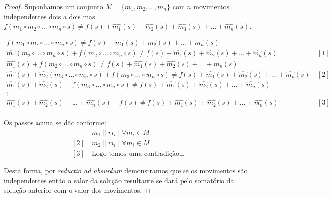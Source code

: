 \begin{proof}\label{proof:independenciaMovimentos}
Suponhamos um conjunto $M = \{ m_1, m_2, \dots, m_n \}$ com $n$ movimentos independentes dois a dois mas $f(m_1 \circ m_2 \circ \dots \circ m_n \circ s) \neq f(s) + \widehat{m_1}(s) + \widehat{m_2}(s)+ \widehat{m_3}(s) + \dots + \widehat{m_n}(s)$.

\begin{align*}
    f(m_1 \circ m_2 \circ \dots \circ m_n \circ s) \neq f(s) + \widehat{m_1}(s) + \widehat{m_2}(s) + \dots + \widehat{m_n}(s) & \\
    \widehat{m_1}(m_2 \circ \dots \circ m_n \circ s) + f(m_2 \circ \dots \circ m_n \circ s) \neq f(s) + \widehat{m_1}(s) + \widehat{m_2}(s) + \dots + \widehat{m_n}(s) & \ [1] \\
    \widehat{m_1}(s) + f(m_2 \circ \dots \circ m_n \circ s) \neq f(s) + \widehat{m_1}(s) + \widehat{m_2}(s) + \dots + \widehat{m_n}(s) & \\
    \widehat{m_1}(s) + \widehat{m_2}(m_3 \circ \dots \circ m_n \circ s) + f(m_3 \circ \dots \circ m_n \circ s) \neq f(s) + \widehat{m_1}(s) + \widehat{m_2}(s) + \dots + \widehat{m_n}(s) & \ [2] \\
    \widehat{m_1}(s) + \widehat{m_2}(s) + f(m_3 \circ \dots \circ m_n \circ s) \neq f(s) + \widehat{m_1}(s) + \widehat{m_2}(s) + \dots + \widehat{m_n}(s) & \\
    \vdots & \\
    \widehat{m_1}(s) + \widehat{m_2}(s) + \dots + \widehat{m_n}(s) + f(s) \neq f(s) + \widehat{m_1}(s) + \widehat{m_2}(s) + \dots + \widehat{m_n}(s) & \ [3] \\
\end{align*}

Os passos acima se dão conforme:
\begin{align*}
[1] \ & m_1 \parallel m_i \mid \forall m_i \in M \\
[2] \ & m_2 \parallel m_i \mid \forall m_i \in M \\
[3] \ & \textrm{Logo temos uma contradição} \bot
\end{align*}

Desta forma, por \textit{reductio ad absurdum} demonstramos que se os movimentos são independentes então o valor da solução resultante se dará pelo somatório da solução anterior com o valor dos movimentos.



\end{proof}
